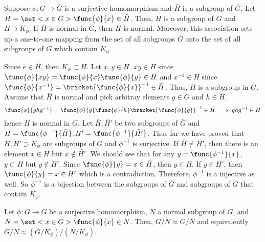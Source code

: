 \begin{lemma}
    Suppose \(\phi: G \to \bar{G}\) is a surjective homomorphism and \(\bar{H}\) is a subgroup of \(\bar{G}\). Let \(H = \set<x \in G>{\func{\phi}{x} \in \bar{H}}\). Then, \(H\) is a subgroup of \(G\) and \(H \supset K_{\phi}\). If \(\bar{H}\) is normal in \(\bar{G}\), then \(H\) is normal. Moreover, this association sets up a one-to-one mapping from the set of all subgroups \(\bar{G}\) onto the set of all subgroups of \(G\) which contain \(K_{\phi}\).
\end{lemma}

\begin{prooflemma}
    Since \(\bar{e} \in \bar{H}\), then \(K_{\phi} \subset H\). Let \(x,y \in H\). \(xy \in H\) since \(\func{\phi}{xy} = \func{\phi}{x} \func{\phi}{y} \in \bar{H}\) and \(x^{-1} \in H\) since \(\func{\phi}{x^{-1}} = \bracket{\func{\phi}{x}}^{-1} \in \bar{H}\). Thus, \(H\) is a subgroup in \(G\). Assume that \(\bar{H}\) is normal and pick arbitray elements \(g \in G\) and \(h \in H\). 
    \begin{equation*}
        \func{\phi}{ghg^{-1}} = \func{\phi}{g} \func{\phi}{h} \bracket{\func{\phi}{g}}^{-1} \in \bar{H } \implies ghg^{-1} \in H
    \end{equation*}
    hence \(H\) is normal in \(G\). Let \(\bar{H},\bar{H'}\) be two subgroups of \(\bar{G}\) and \(H = \func{\phi^{-1}}{\bar{H}},H'= \func{\phi^{-1}}{\bar{H'}}\). Thus far we have proved that \(H,H' \supset K_{\phi}\) are subgroups of \(G\) and \(\phi^{-1}\) is surjective. If \(\bar{H} \neq \bar{H'}\), then there is an element \(x \in \bar{H}\) but \(x \notin \bar{H'}\). We should see that for any \(y = \func{\phi^{-1}}{x}\), \(y \subset H\) but \(y \notin H'\). Since \(\func{\phi}{y} = x \in \bar{H}\), then \(y \in H\). If \(y \in H'\), then \(\func{\phi}{y} = x \in \bar{H'}\) which is a contradiction. Therefore, \(\phi^{-1}\) is a injective as well. So \(\phi^{-1}\) is a bijection between the subgroups of \(\bar{G}\) and subgroups of \(G\) that contain \(K_{\phi}\).
\end{prooflemma}

\begin{theorem}
    Let \(\phi:G \to \bar{G}\) be a surjective homomorphism, \(\bar{N}\) a normal subgroup of \(\bar{G}\), and \(N = \set<x \in G>{\func{\phi}{x} \in N}\). Then, \(G/N \approx \bar{G}/\bar{N}\) and equivalently \(G/N \approx (G/K_{\phi})/(N/K_{\phi})\).
\end{theorem}

